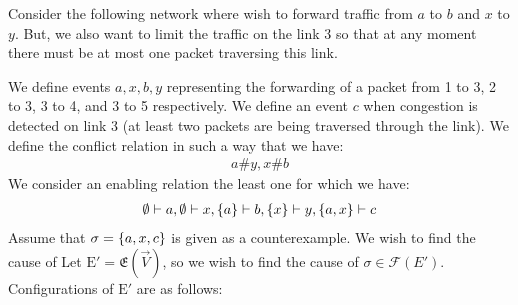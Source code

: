 \begin{example}
    Consider the following network where wish to forward traffic from $a$ to $b$ and $x$ to $y$.
    But, we also want to limit the traffic on the link 3 so that at any moment
    there must be at most one packet traversing this link.
    \begin{center}
    \end{center}
    We define events $a,x,b,y$ representing the forwarding of a packet from
    1 to 3, 2 to 3, 3 to 4, and 3 to 5 respectively.
    We define an event $c$ when congestion is detected on link 3 (at least two packets are being traversed through the link).
    We define the conflict relation in such a way that we have:
    \begin{align*}
        a \# y, x\# b
    \end{align*}
    We consider an enabling relation the least one for which we have:
    \begin{align*}
        \emptyset \vdash a, \emptyset \vdash x, \{a\} \vdash b, \{x\} \vdash y,
        \{a,x\} \vdash c
    \end{align*}
    Assume that $\sigma = \{a,x,c\}$ is given as a counterexample.
    We wish to find the cause of 
    Let $\mathrm{E'} = \mathfrak{E}(\vec V)$, so we wish to find the cause of
    $ \sigma \in \mathcal{F}(E')$.
    Configurations of $\mathrm{E'}$ are as follows:
    \begin{center}
\end{center}
\end{example}

